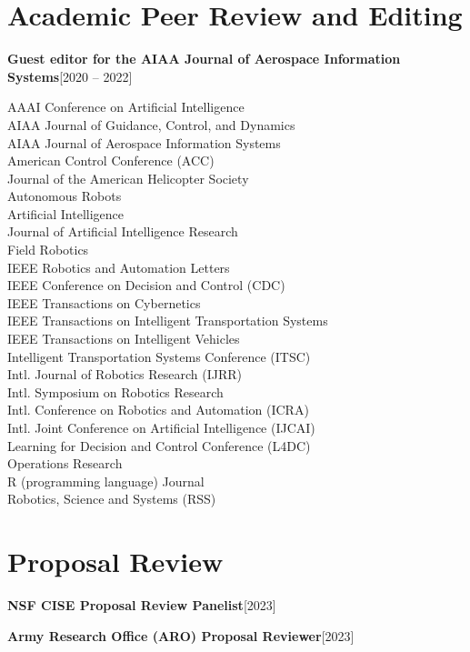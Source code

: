 \documentclass[10pt,roman]{moderncv}
\newcommand{\mycvitem}[2]{
    \textbf{#2}\hfill [#1]\break
}
\begin{document}
\section{Academic Peer Review and Editing}

\mycvitem{2020 -- 2022}{Guest editor for the AIAA Journal of Aerospace Information Systems}

\vspace{-2ex}
\begin{multicols}{2}
\small
AAAI Conference on Artificial Intelligence\\
AIAA Journal of Guidance, Control, and Dynamics\\
AIAA Journal of Aerospace Information Systems\\
American Control Conference (ACC)\\
Journal of the American Helicopter Society\\
Autonomous Robots\\
Artificial Intelligence\\
Journal of Artificial Intelligence Research\\
Field Robotics\\
IEEE Robotics and Automation Letters\\
IEEE Conference on Decision and Control (CDC)\\
IEEE Transactions on Cybernetics\\
IEEE Transactions on Intelligent Transportation Systems\\
IEEE Transactions on Intelligent Vehicles\\
Intelligent Transportation Systems Conference (ITSC)\\
Intl. Journal of Robotics Research (IJRR)\\
Intl. Symposium on Robotics Research\\
Intl. Conference on Robotics and Automation (ICRA)\\
Intl. Joint Conference on Artificial Intelligence (IJCAI)\\
Learning for Decision and Control Conference (L4DC)\\
Operations Research\\
R (programming language) Journal\\
Robotics, Science and Systems (RSS)\\
\end{multicols}

\section{Proposal Review}
\mycvitem{2023}{NSF CISE Proposal Review Panelist}
\mycvitem{2023}{Army Research Office (ARO) Proposal Reviewer}
\end{document}
